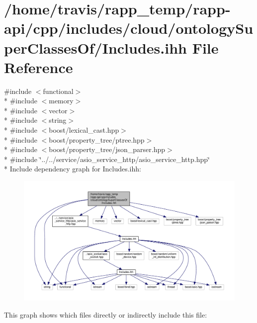 \hypertarget{cloud_2ontologySuperClassesOf_2Includes_8ihh}{\section{/home/travis/rapp\-\_\-temp/rapp-\/api/cpp/includes/cloud/ontology\-Super\-Classes\-Of/\-Includes.ihh File Reference}
\label{cloud_2ontologySuperClassesOf_2Includes_8ihh}
}
{\ttfamily \#include $<$functional$>$}\\*
{\ttfamily \#include $<$memory$>$}\\*
{\ttfamily \#include $<$vector$>$}\\*
{\ttfamily \#include $<$string$>$}\\*
{\ttfamily \#include $<$boost/lexical\-\_\-cast.\-hpp$>$}\\*
{\ttfamily \#include $<$boost/property\-\_\-tree/ptree.\-hpp$>$}\\*
{\ttfamily \#include $<$boost/property\-\_\-tree/json\-\_\-parser.\-hpp$>$}\\*
{\ttfamily \#include \char`\"{}../../service/asio\-\_\-service\-\_\-http/asio\-\_\-service\-\_\-http.\-hpp\char`\"{}}\\*
Include dependency graph for Includes.\-ihh\-:
\nopagebreak
\begin{figure}[H]
\begin{center}
\leavevmode
\includegraphics[width=350pt]{cloud_2ontologySuperClassesOf_2Includes_8ihh__incl}
\end{center}
\end{figure}
This graph shows which files directly or indirectly include this file\-:
\nopagebreak

